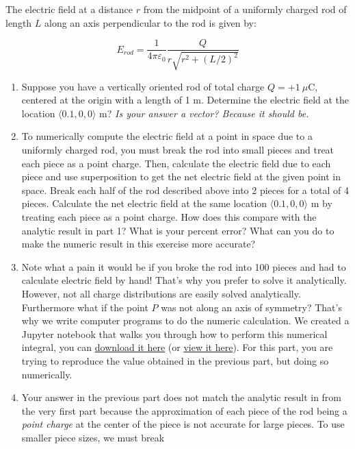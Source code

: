 \documentclass[11pt]{article}
\begin{document}
The electric field at a distance \(r\) from the midpoint of a uniformly
charged rod of length \(L\) along an axis perpendicular to the rod is
given by:

\[E_{rod}=\frac{1}{4\pi\varepsilon_0}\frac{Q}{r\sqrt{r^2+(L/2)^2}}\]

\begin{enumerate}
\def\labelenumi{\arabic{enumi}.}
\item
  Suppose you have a vertically oriented rod of total charge
  \(Q=+1\ \mu\)C, centered at the origin with a length of 1 m. Determine
  the electric field at the location \(\langle 0.1 , 0 , 0 \rangle\) m?
  \emph{Is your answer a vector? Because it should be.}
\item
  To numerically compute the electric field at a point in space due to a
  uniformly charged rod, you must break the rod into small pieces and
  treat each piece as a point charge. Then, calculate the electric field
  due to each piece and use superposition to get the net electric field
  at the given point in space. Break each half of the rod described
  above into 2 pieces for a total of 4 pieces. Calculate the net
  electric field at the same location \(\langle 0.1 , 0 , 0 \rangle\) m
  by treating each piece as a point charge. How does this compare with
  the analytic result in part 1? What is your percent error? What can
  you do to make the numeric result in this exercise more accurate?
\item
  Note what a pain it would be if you broke the rod into 100 pieces and
  had to calculate electric field by hand! That's why you prefer to
  solve it analytically. However, not all charge distributions are
  easily solved analytically. Furthermore what if the point \(P\) was
  not along an axis of symmetry? That's why we write computer programs
  to do the numeric calculation. We created a Jupyter notebook that
  walks you through how to perform this numerical integral, you can
  \href{../jupyter/HW2-ElectricFieldChargedRod.ipynb}{download it here}
  (or
  \href{https://github.com/dannycab/phy481msu/blob/gh-pages/jupyter/HW2-ElectricFieldChargedRod.ipynb}{view
  it here}). For this part, you are trying to reproduce the value
  obtained in the previous part, but doing so numerically.
\item
  Your answer in the previous part does not match the analytic result in
  from the very first part because the approximation of each piece of
  the rod being a \emph{point charge} at the center of the piece is not
  accurate for large pieces. To use smaller piece sizes, we must break

\end{enumerate}
\end{document}
